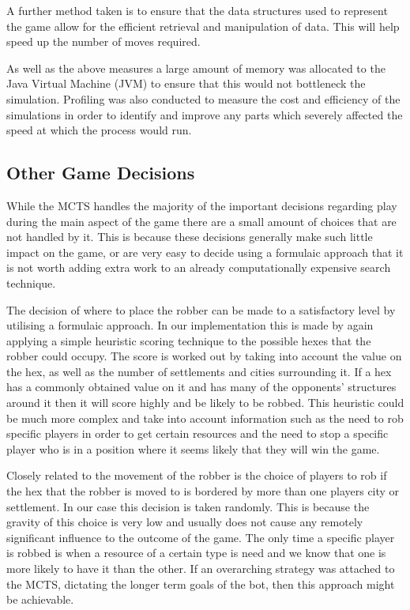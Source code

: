 \documentclass[]{article}
\begin{document}
\par A further method taken is to ensure that the data structures used to represent the game allow for the efficient retrieval and manipulation of data. This will help speed up the number of moves required. 

\par As well as the above measures a large amount of memory was allocated to the Java Virtual Machine (JVM) to ensure that this would not bottleneck the simulation. Profiling was also conducted to measure the cost and efficiency of the simulations in order to identify and improve any parts which severely affected the speed at which the process would run. 


\subsection{Other Game Decisions}
While the MCTS handles the majority of the important decisions regarding play during the main aspect of the game there are a small amount of choices that are not handled by it. This is because these decisions generally make such little impact on the game, or are very easy to decide using a formulaic approach that it is not worth adding extra work to an already computationally expensive search technique.

\par The decision of where to place the robber can be made to a satisfactory level by utilising a formulaic approach. In our implementation this is made by again applying a simple heuristic scoring technique to the possible hexes that the robber could occupy. The score is worked out by taking into account the value on the hex, as well as the number of settlements and cities surrounding it. If a hex has a commonly obtained value on it and has many of the opponents' structures around it then it will score highly and be likely to be robbed. This heuristic could be much more complex and take into account information such as the need to rob specific players in order to get certain resources and the need to stop a specific player who is in a position where it seems likely that they will win the game. 

\par Closely related to the movement of the robber is the choice of players to rob if the hex that the robber is moved to is bordered by more than one players city or settlement. In our case this decision is taken randomly. This is because the gravity of this choice is very low and usually does not cause any remotely significant influence to the outcome of the game. The only time a specific player is robbed is when a resource of a certain type is need and we know that one is more likely to have it than the other. If an overarching strategy was attached to the MCTS, dictating the longer term goals of the bot, then this approach might be achievable.
\end{document}
